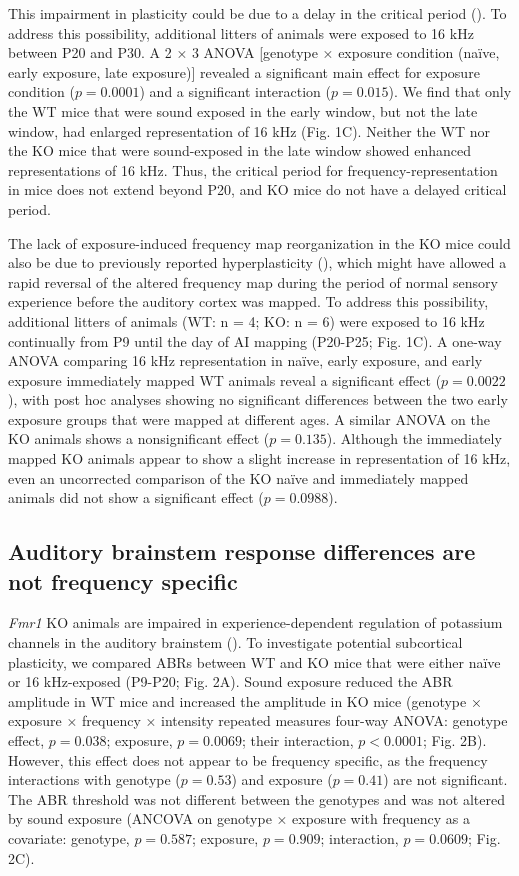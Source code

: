 This impairment in plasticity could be due to a delay in the critical period (\cite{Harlow2010}). To address this possibility, additional litters of animals were exposed to 16 kHz between P20 and P30. A 2 × 3 ANOVA [genotype × exposure condition (na\"ive, early exposure, late exposure)] revealed a significant main effect for exposure condition ($p=0.0001$) and a significant interaction ($p=0.015$). We find that only the WT mice that were sound exposed in the early window, but not the late window, had enlarged representation of 16 kHz (Fig. 1C). Neither the WT nor the KO mice that were sound-exposed in the late window showed enhanced representations of 16 kHz. Thus, the critical period for frequency-representation in mice does not extend beyond P20, and KO mice do not have a delayed critical period.

The lack of exposure-induced frequency map reorganization in the KO mice could also be due to previously reported hyperplasticity (\cite{Dolen2007}), which might have allowed a rapid reversal of the altered frequency map during the period of normal sensory experience before the auditory cortex was mapped. To address this possibility, additional litters of animals (WT: n = 4; KO: n = 6) were exposed to 16 kHz continually from P9 until the day of AI mapping (P20-P25; Fig. 1C). A one-way ANOVA comparing 16 kHz representation in na\"ive, early exposure, and early exposure immediately mapped WT animals reveal a significant effect ($p=0.0022$), with post hoc analyses showing no significant differences between the two early exposure groups that were mapped at different ages. A similar ANOVA on the KO animals shows a nonsignificant effect ($p=0.135$). Although the immediately mapped KO animals appear to show a slight increase in representation of 16 kHz, even an uncorrected comparison of the KO na\"ive and immediately mapped animals did not show a significant effect ($p=0.0988$).

\subsection{Auditory brainstem response differences are not frequency specific}

\textit{Fmr1} KO animals are impaired in experience-dependent regulation of potassium channels in the auditory brainstem (\cite{Strumbos2010}). To investigate potential subcortical plasticity, we compared ABRs between WT and KO mice that were either na\"ive or 16 kHz-exposed (P9-P20; Fig. 2A). Sound exposure reduced the ABR amplitude in WT mice and increased the amplitude in KO mice (genotype × exposure × frequency × intensity repeated measures four-way ANOVA: genotype effect, $p=0.038$; exposure, $p=0.0069$; their interaction, $p<0.0001$; Fig. 2B). However, this effect does not appear to be frequency specific, as the frequency interactions with genotype ($p=0.53$) and exposure ($p=0.41$) are not significant. The ABR threshold was not different between the genotypes and was not altered by sound exposure (ANCOVA on genotype × exposure with frequency as a covariate: genotype, $p=0.587$; exposure, $p=0.909$; interaction, $p=0.0609$; Fig. 2C).

